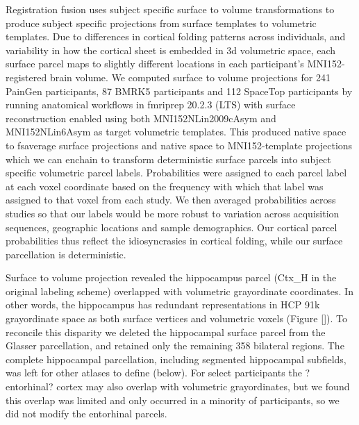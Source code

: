 \documentclass[10pt,letterpaper]{article}
\begin{document}
Registration fusion uses subject specific surface to volume transformations to produce subject specific projections from surface templates to volumetric templates. Due to differences in cortical folding patterns across individuals, and variability in how the cortical sheet is embedded in 3d volumetric space, each surface parcel maps to slightly different locations in each participant's MNI152-registered brain volume. We computed surface to volume projections for 241 PainGen participants, 87 BMRK5 participants and 112 SpaceTop participants by running anatomical workflows in fmriprep 20.2.3 (LTS) with surface reconstruction enabled using both MNI152NLin2009cAsym and MNI152NLin6Asym as target volumetric templates. This produced native space to fsaverage surface projections and native space to MNI152-template projections which we can enchain to transform deterministic surface parcels into subject specific volumetric parcel labels. Probabilities were assigned to each parcel label at each voxel coordinate based on the frequency with which that label was assigned to that voxel from each study. We then averaged probabilities across studies so that our labels would be more robust to variation across acquisition sequences, geographic locations and sample demographics. Our cortical parcel probabilities thus reflect the idiosyncrasies in cortical folding, while our surface parcellation is deterministic. 

Surface to volume projection revealed the hippocampus parcel (Ctx\_H in the original labeling scheme) overlapped with volumetric grayordinate coordinates. In other words, the hippocampus has redundant representations in HCP 91k grayordinate space as both surface vertices and volumetric voxels (Figure \ref{}). To reconcile this disparity we deleted the hippocampal surface parcel from the Glasser parcellation, and retained only the remaining 358 bilateral regions. The complete hippocampal parcellation, including segmented hippocampal subfields, was left for other atlases to define (below). For select participants the ?entorhinal? cortex may also overlap with volumetric grayordinates, but we found this overlap was limited and only occurred in a minority of participants, so we did not modify the entorhinal parcels.
\end{document}
